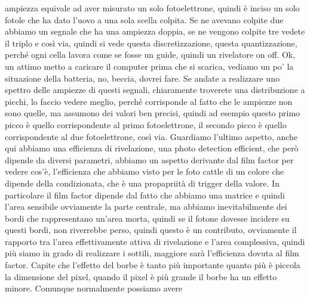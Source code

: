 ampiezza equivale ad aver misurato un solo fotoelettrone, quindi è inciso un solo fotole che ha dato l'uovo a una sola scella colpita. Se ne avevano colpite due abbiamo un segnale che ha una ampiezza doppia, se ne vengono colpite tre vedete il triplo e così via, quindi si vede questa discretizzazione, questa quantizzazione, perché ogni cella lavora come se fosse un guide, quindi un rivelatore on off. Ok, un attimo metto a caricare il computer prima che si scarica, vediamo un po' la situazione della batteria, no, beccia, dovrei fare. Se andate a realizzare uno spettro delle ampiezze di questi segnali, chiaramente troverete una distribuzione a picchi, lo faccio vedere meglio, perché corrisponde al fatto che le ampiezze non sono quelle, ma assumono dei valori ben precisi, quindi ad esempio questo primo picco è quello corrispondente al primo fotoelettrone, il secondo picco è quello corrispondente al due fotoelettrone, così via. Guardiamo l'ultimo aspetto, anche qui abbiamo una efficienza di rivelazione, una photo detection efficient, che però dipende da diversi parametri, abbiamo un aspetto derivante dal film factor per vedere cos'è, l'efficienza che abbiamo visto per le foto cattle di un colore che dipende della condizionata, che è una propapriità di trigger della valore. In particolare il film factor dipende dal fatto che abbiamo una matrice e quindi l'area sensibile ovviamente la parte centrale, ma abbiamo inevitabilmente dei bordi che rappresentano un'area morta, quindi se il fotone dovesse incidere su questi bordi, non riverrebbe perso, quindi questo è un contributo, ovviamente il rapporto tra l'area effettivamente attiva di rivelazione e l'area complessiva, quindi più siamo in grado di realizzare i sottili, maggiore sarà l'efficienza dovuta al film factor. Capite che l'effetto del borbe è tanto più importante quanto più è piccola la dimensione del pixel, quando il pixel è più grande il borbe ha un effetto minore. Comunque normalmente possiamo avere

